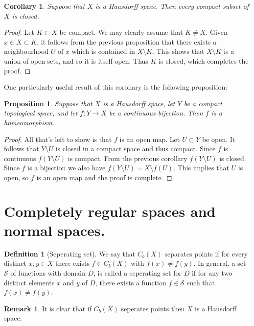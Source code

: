 \documentclass[11pt,a4paper]{article}
\theoremstyle{definition}
\newtheorem{definition}{Definition}[section]
\newtheorem{remark}{Remark}[section]
\theoremstyle{plain}
\newtheorem{proposition}[theorem]{Proposition}
\newtheorem{corollary}[theorem]{Corollary}
\begin{document}
  \begin{corollary}
    Suppose that $X$ is a Hausdorff space. Then every compact subset
    of $X$ is closed.
  \end{corollary}
  \begin{proof}
    Let $K \subset X$ be compact. We may clearly assume that 
    $K \neq X$. Given $x \in X \subset K$, it follows from the previous
    proposition that there exists a neighbourhood $U$ of $x$ which is 
    contained in $X \setminus K$. This shows that $X \setminus K$ is a 
    union of open sets, and so it is itself open. Thus $K$ is 
    closed, which completes the proof. 
  \end{proof}
  
  One particularly useful result of this corollary is the following
  proposition:
  \begin{proposition}
    Suppose that $X$ is a Hausdorff space, let $Y$ be a compact 
    topological space, and let $f \colon Y \to X$ be a continuous 
    bijection. Then $f$ is a homeomorphism.
  \end{proposition}
  \begin{proof}
    All that's left to show is that $f$ is an open map. Let $U \subset Y$
    be open. It follows that $Y \setminus U$ is closed in a compact space
    and thus compact. Since $f$ is continuous $f(Y \setminus U)$ is
    compact. From the previous corollary $f(Y \setminus U)$ is closed.
    Since $f$ is a bijection we also have 
    $f(Y \setminus U) = X \setminus f(U)$. This implies that $U$ is open,
    so $f$ is an open map and the proof is complete.
  \end{proof}

  \newpage

  \section{Completely regular spaces and normal spaces.}
  \begin{definition}[Seperating set]
    We say that $C_b(X)$ separates points if for every distinct 
    $x, y \in X$ there exists $f \in C_b(X)$ with $f(x) \neq f(y)$.
    In general, a set $\mathcal S$ of functions with domain $D$,
    is called a seperating set for $D$ if for any two distinct elements
    $x$ and $y$ of $D$, there exists a function $f \in \mathcal S$ such
    that $f(x) \neq f(y)$.
  \end{definition}
  
  \begin{remark}
    It is clear that if $C_b(X)$ seperates points then $X$ is a Hausdorff
    space.
  \end{remark}
\end{document}
